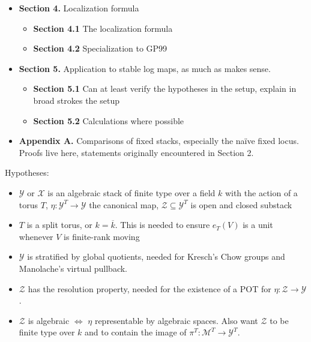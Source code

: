 \documentclass[12pt,dvipsnames]{amsart}
\begin{document}
\begin{itemize}
        \begin{itemize}
          \item \textbf{Section 3.1} The localized equivariant Chow groups and Euler classes of vector bundle stacks
          \item \textbf{Section 3.2} The construction of the residue, existence, independence, definition, cone-stack counterexample
          \item \textbf{Section 3.3} Compatability with Edidin-Graham: \textbf{Res} is the inverse when one exists. Just a sanity check.
        \end{itemize}
  \item \textbf{Section 4.} Localization formula
        \begin{itemize}
          \item \textbf{Section 4.1} The localization formula
          \item \textbf{Section 4.2} Specialization to GP99
        \end{itemize}
  \item \textbf{Section 5.} Application to stable log maps, as much as makes sense.
        \begin{itemize}
          \item \textbf{Section 5.1} Can at least verify the hypotheses in the setup, explain in broad strokes the setup
          \item \textbf{Section 5.2} Calculations where possible
        \end{itemize}
        \item \textbf{Appendix A.} Comparisons of fixed stacks, especially the na\"ive fixed locus. Proofs live here, statements originally encountered in Section 2.
\end{itemize}

\newpage

Hypotheses:
\begin{itemize}
  \item \(\mathcal Y\) or \(\mathcal X\) is an algebraic stack of finite type over a field \(k\) with the action of a torus \(T\), \(\eta:\mathcal Y^T\to \mathcal Y\) the canonical map, \(\mathcal Z\subseteq \mathcal Y^T\) is open and closed substack
  \item \(T\) is a split torus, or \(k = \overline k\). This is needed to ensure \(e_T(V)\) is a unit whenever \(V\) is finite-rank moving
  \item \(\mathcal Y\) is stratified by global quotients, needed for Kresch's Chow groups and Manolache's virtual pullback.
  \item \(\mathcal Z\) has the resolution property, needed for the existence of a POT for \(\eta:\mathcal Z\to \mathcal Y\).
  \item \(\mathcal Z\) is algebraic \(\iff\) \(\eta\) representable by algebraic spaces. Also want \(\mathcal Z\) to be finite type over \(k\) and to contain the image of \(\pi^T:\mathcal M^T\to \mathcal Y^T\).
\end{itemize}
\end{document}
